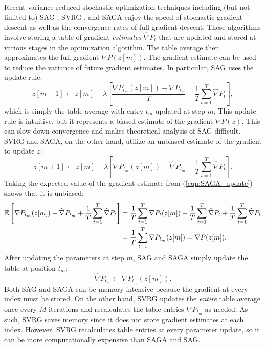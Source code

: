 Recent variance-reduced stochastic optimization techniques including (but not limited to) SAG \citep{Schmidt:2017}, SVRG \citep{Johnson:2013}, and SAGA \citep{Defazio:2014} enjoy the speed of stochastic gradient descent as well as the convergence rates of full gradient descent. These algorithms involve storing a table of gradient \textit{estimates} $\widehat \nabla P_t$ that are updated and stored at various stages in the optimization algorithm. The table average then approximates the full gradient $\nabla P(z[m])$. The gradient estimate can be used to reduce the variance of future gradient estimates. In particular, SAG uses the update rule:
%
\begin{equation}
    z[m+1] \gets z[m] - \lambda \left[\frac{\nabla P_{t_m}(z[m]) - \widehat \nabla P_{t_m}}{T} + \frac{1}{T} \sum_{t=1}^T \widehat \nabla P_{t} \right], \label{eqn:SAG_update}
\end{equation}
%
which is simply the table average with entry $t_m$ updated at step $m$. This update rule is intuitive, but it represents a biased estimate of the gradient $\nabla P(z)$. This can slow down convergence and makes theoretical analysis of SAG difficult. SVRG and SAGA, on the other hand, utilize an unbiased estimate of the gradient to update $z$:
%
\begin{equation}
    z[m+1] \gets z[m] - \lambda \left[\nabla P_{t_m}(z[m]) - \widehat \nabla P_{t_m} + \frac{1}{T} \sum_{t=1}^T \widehat \nabla P_{t} \right].
    \label{eqn:SAGA_update}
\end{equation}
%
Taking the expected value of the gradient estimate from (\ref{eqn:SAGA_update}) shows that it is unbiased:
%
\begin{align*}
    \mathbb{E}\left[\nabla P_{t_m}(z[m]) - \widehat \nabla P_{t_m} + \frac{1}{T} \sum_{t=1}^T \widehat \nabla P_{t} \right] &= \frac{1}{T} \sum_{t=1}^T \nabla P_{t}(z[m]) - \frac{1}{T} \sum_{t=1}^T \widehat \nabla P_{t} + \frac{1}{T} \sum_{t=1}^T \widehat \nabla P_{t} \\
    &= \frac{1}{T} \sum_{t=1}^T \nabla P_{t_m}(z[m]) = \nabla P(z[m]).
\end{align*}
%
After updating the parameters at step $m$, SAG and SAGA simply update the table at position $t_m$: 
%
\begin{equation}
    \widehat \nabla P_{t_m} \leftarrow \nabla P_{t_m}(z[m]).
\end{equation}
%
Both SAG and SAGA can be memory intensive because the gradient at every index must be stored. On the other hand, SVRG updates the \textit{entire} table average once every $M$ iterations and recalculates the table entries $\widehat \nabla P_{t_m}$ as needed. As such, SVRG saves memory since it does not store gradient estimates at each index. However, SVRG recalculates table entries at every parameter update, so it can be more computationally expensive than SAGA and SAG. 

